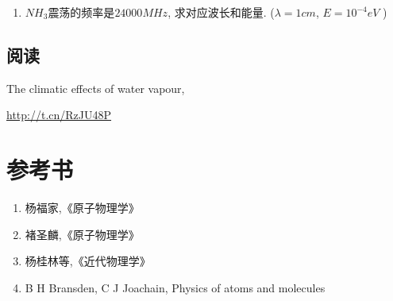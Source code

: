 \begin{enumerate}
  \item $NH_3$震荡的频率是$24000 MHz$, 求对应波长和能量. ($\lambda = 1cm$, $E = 10^{-4}eV$ )
\end{enumerate}



\subsection*{阅读}

The climatic effects of water vapour,

\url{http://t.cn/RzJU48P}


\section*{参考书}

\begin{enumerate}
  \item 杨福家,《原子物理学》
  \item 褚圣麟,《原子物理学》
  \item 杨桂林等,《近代物理学》
  \item B H Bransden, C J Joachain, Physics of atoms and molecules
\end{enumerate}
